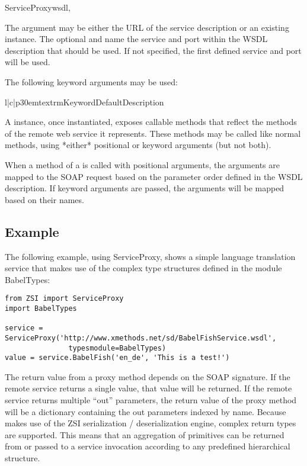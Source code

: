 \begin{classdesc}{ServiceProxy}{wsdl,}

The  argument may be either the URL of the service description 
or an existing  instance. The optional  and 
 name the service and port within the WSDL description that 
should be used. If not specified, the first defined service and port 
will be used.

The following keyword arguments may be used:

\begin{tableiii}{l|c|p{30em}}{textrm}{Keyword}{Default}{Description}
\end{tableiii}

A  instance, once instantiated, exposes callable 
methods that reflect the methods of the remote web service it 
represents. These methods may be called like normal methods, using 
*either* positional or keyword arguments (but not both).

When a method of a  is called with positional 
arguments, the arguments are mapped to the SOAP request based on 
the parameter order defined in the WSDL description. If keyword 
arguments are passed, the arguments will be mapped based on their 
names.

\end{classdesc}

\subsection{Example}

The following example, using ServiceProxy,  shows a simple language
translation service that makes
use of the complex type structures defined in the module BabelTypes:

\begin{verbatim}
from ZSI import ServiceProxy
import BabelTypes

service = ServiceProxy('http://www.xmethods.net/sd/BabelFishService.wsdl',
		       typesmodule=BabelTypes)
value = service.BabelFish('en_de', 'This is a test!')
\end{verbatim}

The return value from a proxy method depends on the SOAP signature. If the 
remote service returns a single value, that value will be returned. If the 
remote service returns multiple ``out'' parameters, the return value of the 
proxy method will be a dictionary containing the out parameters indexed by 
name.  Because  makes use of the ZSI serialization / 
deserialization engine, complex return types are supported.  This means 
that an aggregation of primitives can be returned from or passed to a service
invocation according to any predefined hierarchical structure.


